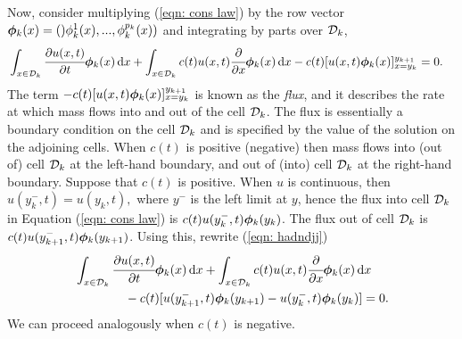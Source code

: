 Now, consider multiplying (\ref{eqn: cons law}) by the row vector \(\boldsymbol \phi_k(x)=()\phi_k^1(x),...,\phi_k^{p_k}(x))\) and integrating by parts over \(\mathcal{D}_k\),
\begin{align}
	&\int_{x\in \mathcal{D}_k}\cfrac{\partial u(x,t)}{\partial t}\boldsymbol\phi_k(x)\, \mathrm{d} x + \int_{x\in \mathcal{D}_k} c(t) u(x,t)\cfrac{\partial}{\partial x} \boldsymbol \phi_k( x)\, \mathrm{d} x - c(t)[u(x,t)\boldsymbol \phi_k(x)]_{x=y_k}^{y_{k+1}} = 0.\label{eqn: hadndjj}
\end{align}
The term \(- c(t)[u(x,t)\boldsymbol \phi_k(x)]_{x=y_k}^{y_{k+1}}\) is known as the \emph{flux}, and it describes the rate at which mass flows into and out of the cell \(\mathcal{D}_k\). The flux is essentially a boundary condition on the cell \(\mathcal{D}_k\) and is specified by the value of the solution on the adjoining cells. When \(c(t)\) is positive (negative) then mass flows into (out of) cell \(\mathcal{D}_k\) at the left-hand boundary, and out of (into) cell \(\mathcal{D}_k\) at the right-hand boundary. Suppose that \(c(t)\) is positive. When \(u\) is continuous, then \(u(y_{k}^-,t)=u(y_k,t),\) where \(y^-\) is the left limit at \(y\), hence the flux into cell \(\mathcal{D}_k\) in Equation (\ref{eqn: cons law}) is \(c(t)u(y_k^-,t)\boldsymbol \phi_k(y_k)\). The flux out of cell \(\mathcal{D}_k\) is \(c(t)u(y_{k+1}^-,t)\boldsymbol \phi_k(y_{k+1})\). Using this, rewrite (\ref{eqn: hadndjj})
\begin{align}
	&\int_{x\in \mathcal{D}_k}\cfrac{\partial u(x,t)}{\partial t}\boldsymbol\phi_k(x)\, \mathrm{d} x + \int_{x\in \mathcal{D}_k} c(t) u(x,t)\cfrac{\partial}{\partial x} \boldsymbol \phi_k( x)\, \mathrm{d} x \nonumber
	\\&\qquad\qquad{}- c(t)[u(y_{k+1}^-,t)\boldsymbol \phi_k(y_{k+1}) - u(y_{k}^-,t)\boldsymbol \phi_k(y_{k})] = 0.\label{eqn: hadndjjj}
\end{align}
We can proceed analogously when \(c(t)\) is negative. 


